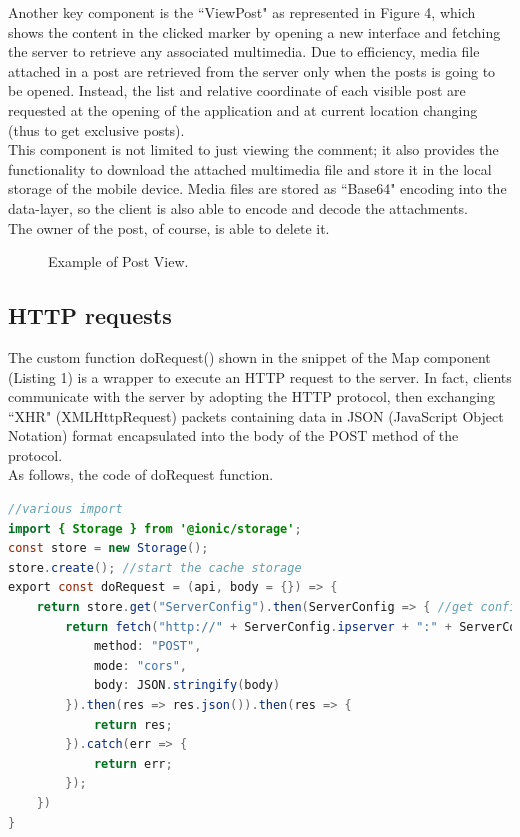 \documentclass[conference]{IEEEtran}
\begin{document}
Another key component is the ``ViewPost" as represented in Figure 4, which shows the content in the clicked marker by opening a new interface and fetching the server to retrieve any associated multimedia.
Due to efficiency, media file attached in a post are retrieved from the server only when the posts is going to be opened.
Instead, the list and relative coordinate of each visible post are requested at the opening of the application and at current location changing (thus to get exclusive posts).
\\
This component is not limited to just viewing the comment; it also provides the functionality to download the attached multimedia file and store it in the local storage of the mobile device.
Media files are stored as ``Base64" encoding into the data-layer, so the client is also able to encode and decode the attachments.
\\
The owner of the post, of course, is able to delete it.

\begin{figure}[htbp]
\begin{center}
\end{center}
\caption{Example of Post View.}
\label{fig}
\end{figure}
\FloatBarrier 


\subsection{HTTP requests}

The custom function doRequest() shown in the snippet of the Map component (Listing 1) is a wrapper to execute an HTTP request to the server.
In fact, clients communicate with the server by adopting the HTTP protocol, then exchanging ``XHR" (XMLHttpRequest) packets containing data in JSON (JavaScript Object Notation) format encapsulated into the body of the POST method of the protocol.
\\
As follows, the code of doRequest function.
\begin{lstlisting}[language=Java, caption=Method doRequest to fetch server]
//various import 
import { Storage } from '@ionic/storage';
const store = new Storage(); 
store.create(); //start the cache storage
export const doRequest = (api, body = {}) => {
    return store.get("ServerConfig").then(ServerConfig => { //get config from cache
        return fetch("http://" + ServerConfig.ipserver + ":" + ServerConfig.port + "/" + api, {
            method: "POST",
            mode: "cors",
            body: JSON.stringify(body)
        }).then(res => res.json()).then(res => {
            return res;
        }).catch(err => {
            return err;
        });
    })
}
\end{lstlisting}
\end{document}

